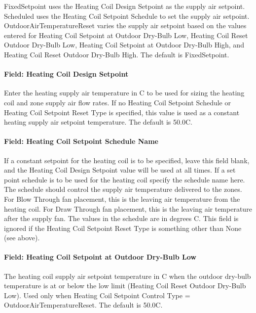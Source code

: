 FixedSetpoint uses the Heating Coil Design Setpoint as the supply air setpoint. Scheduled uses the Heating Coil Setpoint Schedule to set the supply air setpoint. OutdoorAirTemperatureReset varies the supply air setpoint based on the values entered for Heating Coil Setpoint at Outdoor Dry-Bulb Low, Heating Coil Reset Outdoor Dry-Bulb Low, Heating Coil Setpoint at Outdoor Dry-Bulb High, and Heating Coil Reset Outdoor Dry-Bulb High. The default is FixedSetpoint.

\paragraph{Field: Heating Coil Design Setpoint}\label{field-heating-coil-design-setpoint-4}

Enter the heating supply air temperature in C to be used for sizing the heating coil and zone supply air flow rates. If no Heating Coil Setpoint Schedule or Heating Coil Setpoint Reset Type is specified, this value is used as a constant heating supply air setpoint temperature. The default is 50.0C.

\paragraph{Field: Heating Coil Setpoint Schedule Name}\label{field-heating-coil-setpoint-schedule-name-3}

If a constant setpoint for the heating coil is to be specified, leave this field blank, and the Heating Coil Design Setpoint value will be used at all times. If a set point schedule is to be used for the heating coil specify the schedule name here. The schedule should control the supply air temperature delivered to the zones. For Blow Through fan placement, this is the leaving air temperature from the heating coil. For Draw Through fan placement, this is the leaving air temperature after the supply fan. The values in the schedule are in degrees C. This field is ignored if the Heating Coil Setpoint Reset Type is something other than None (see above).

\paragraph{Field: Heating Coil Setpoint at Outdoor Dry-Bulb Low}\label{field-heating-coil-setpoint-at-outdoor-dry-bulb-low-1}

The heating coil supply air setpoint temperature in C when the outdoor dry-bulb temperature is at or below the low limit (Heating Coil Reset Outdoor Dry-Bulb Low). Used only when Heating Coil Setpoint Control Type = OutdoorAirTemperatureReset. The default is 50.0C.

